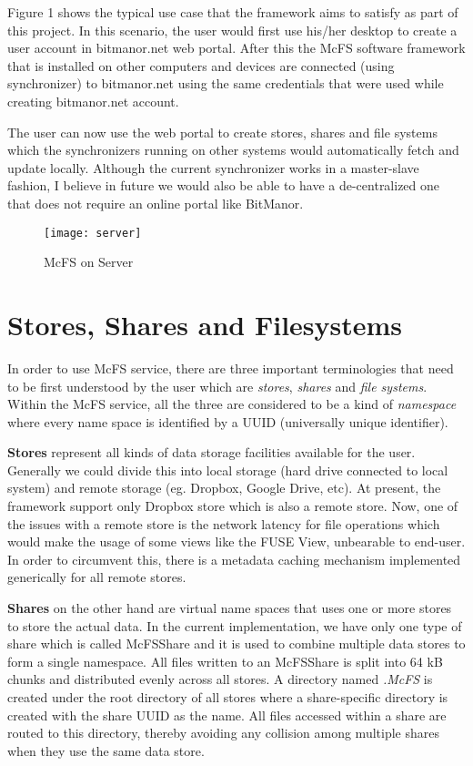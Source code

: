 Figure 1 shows the typical use case that the framework aims to satisfy as part of this project. In this scenario, the user would first use his/her desktop to create a user account in bitmanor.net web portal. After this the McFS software framework that is installed on other computers and devices are connected (using synchronizer) to bitmanor.net using the same credentials that were used while creating bitmanor.net account.

The user can now use the web portal to create stores, shares and file systems which the synchronizers running on other systems would automatically fetch and update locally. Although the current synchronizer works in a master-slave fashion, I believe in future we would also be able to have a de-centralized one that does not require an online portal like BitManor.

\begin{figure*}
  \centering
  \texttt{[image: server]}
  \caption{McFS on Server}
\end{figure*}

\section{Stores, Shares and Filesystems}

In order to use McFS service, there are three important terminologies that need to be first understood by the user which are \emph{stores}, \emph{shares} and \emph{file systems}. Within the McFS service, all the three are considered to be a kind of \emph{namespace} where every name space is identified by a UUID (universally unique identifier).

\textbf{Stores} represent all kinds of data storage facilities available for the user. Generally we could divide this into local storage (hard drive connected to local system) and remote storage (eg. Dropbox, Google Drive, etc). At present, the framework support only Dropbox store which is also a remote store. Now, one of the issues with a remote store is the network latency for file operations which would make the usage of some views like the FUSE View, unbearable to end-user. In order to circumvent this, there is a metadata caching mechanism implemented generically for all remote stores.

\textbf{Shares} on the other hand are virtual name spaces that uses one or more stores to store the actual data. In the current implementation, we have only one type of share which is called McFSShare and it is used to combine multiple data stores to form a single namespace. All files written to an McFSShare is split into 64 kB chunks and distributed evenly across all stores. A directory named \emph{.McFS} is created under the root directory of all stores where a share-specific directory is created with the share UUID as the name. All files accessed within a share are routed to this directory, thereby avoiding any collision among multiple shares when they use the same data store.

